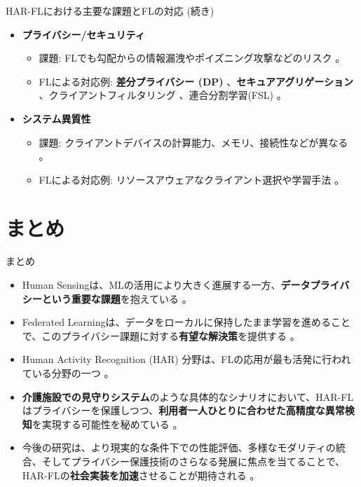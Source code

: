 \documentclass[unicode,12pt,aspectratio=169,dvipdfmx]{beamer}
\begin{document}
\begin{frame}{HAR-FLにおける主要な課題とFLの対応 (続き)}
    \begin{itemize}
        \item \textbf{プライバシー/セキュリティ} \cite{Source55, Source544}
        \begin{itemize}
            \item 課題: FLでも勾配からの情報漏洩やポイズニング攻撃などのリスク \cite{Source103, Source522}。
            \item FLによる対応例: \textbf{差分プライバシー (DP)} \cite{Source303, Source348}、\textbf{セキュアアグリゲーション} \cite{Source344, Source544}、クライアントフィルタリング \cite{Source107}、連合分割学習(FSL) \cite{Source348}。
        \end{itemize}
        \item \textbf{システム異質性} \cite{Source55, Source544}
        \begin{itemize}
            \item 課題: クライアントデバイスの計算能力、メモリ、接続性などが異なる \cite{Source55, Source521}。
            \item FLによる対応例: リソースアウェアなクライアント選択や学習手法 \cite{Source109, Source110}。
        \end{itemize}
    \end{itemize}
\end{frame}

\section{まとめ}
\begin{frame}{まとめ}
    \begin{itemize}
        \item Human Sensingは、MLの活用により大きく進展する一方、\textbf{データプライバシーという重要な課題}を抱えている \cite{Source52, Source55}。
        \item Federated Learningは、データをローカルに保持したまま学習を進めることで、このプライバシー課題に対する\textbf{有望な解決策}を提供する \cite{Source52, Source55}。
        \item Human Activity Recognition (HAR) 分野は、FLの応用が最も活発に行われている分野の一つ \cite{Source101}。
        \item \textbf{介護施設での見守りシステム}のような具体的なシナリオにおいて、HAR-FLはプライバシーを保護しつつ、\textbf{利用者一人ひとりに合わせた高精度な異常検知}を実現する可能性を秘めている \cite{Source515, Source543}。
        \item 今後の研究は、より現実的な条件下での性能評価、多様なモダリティの統合、そしてプライバシー保護技術のさらなる発展に焦点を当てることで、HAR-FLの\textbf{社会実装を加速}させることが期待される \cite{Source105}。
    \end{itemize}
\end{frame}
\end{document}
